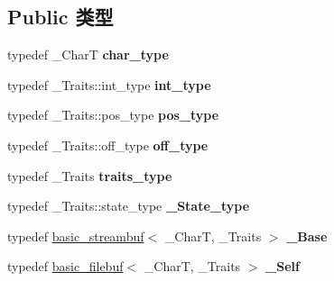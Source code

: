 \subsection*{Public 类型}
\begin{DoxyCompactItemize}
\item 
\mbox{\label{classbasic__filebuf_a06f12bb8749e676bbe21be184cf56e70}} 
typedef \+\_\+\+CharT {\bfseries char\+\_\+type}
\item 
\mbox{\label{classbasic__filebuf_ac0a1b574537042ba5891894a24b7c5cd}} 
typedef \+\_\+\+Traits\+::int\+\_\+type {\bfseries int\+\_\+type}
\item 
\mbox{\label{classbasic__filebuf_a7ae8fa7e9e6d8e3381165d7fc17897ee}} 
typedef \+\_\+\+Traits\+::pos\+\_\+type {\bfseries pos\+\_\+type}
\item 
\mbox{\label{classbasic__filebuf_ac0c0c431ac2128e71c3168ab39cbe050}} 
typedef \+\_\+\+Traits\+::off\+\_\+type {\bfseries off\+\_\+type}
\item 
\mbox{\label{classbasic__filebuf_afd60709c574f47fe14abcab6ca5632d3}} 
typedef \+\_\+\+Traits {\bfseries traits\+\_\+type}
\item 
\mbox{\label{classbasic__filebuf_ace58deb1f595bf6226621da252e45b7b}} 
typedef \+\_\+\+Traits\+::state\+\_\+type {\bfseries \+\_\+\+State\+\_\+type}
\item 
\mbox{\label{classbasic__filebuf_aa9073699464012d6da1a85f58be9791a}} 
typedef \hyperlink{classbasic__streambuf}{basic\+\_\+streambuf}$<$ \+\_\+\+CharT, \+\_\+\+Traits $>$ {\bfseries \+\_\+\+Base}
\item 
\mbox{\label{classbasic__filebuf_a7ffcadd9527569233bfc6f82ccd95dbb}} 
typedef \hyperlink{classbasic__filebuf}{basic\+\_\+filebuf}$<$ \+\_\+\+CharT, \+\_\+\+Traits $>$ {\bfseries \+\_\+\+Self}
\end{DoxyCompactItemize}

